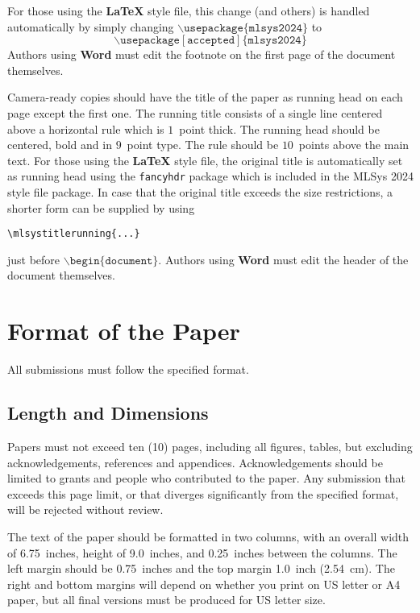 \documentclass{article}
\begin{document}
For those using the \textbf{\LaTeX} style file, this change (and others) is
handled automatically by simply changing
$\mathtt{\backslash usepackage\{mlsys2024\}}$ to
$$\mathtt{\backslash usepackage[accepted]\{mlsys2024\}}$$
Authors using \textbf{Word} must edit the
footnote on the first page of the document themselves.

Camera-ready copies should have the title of the paper as running head
on each page except the first one. The running title consists of a
single line centered above a horizontal rule which is $1$~point thick.
The running head should be centered, bold and in $9$~point type. The
rule should be $10$~points above the main text. For those using the
\textbf{\LaTeX} style file, the original title is automatically set as running
head using the \texttt{fancyhdr} package which is included in the MLSys
2024 style file package. In case that the original title exceeds the
size restrictions, a shorter form can be supplied by using

\verb|\mlsystitlerunning{...}|

just before $\mathtt{\backslash begin\{document\}}$.
Authors using \textbf{Word} must edit the header of the document themselves.

\section{Format of the Paper}

All submissions must follow the specified format.

\subsection{Length and Dimensions}

Papers must not exceed ten (10) pages, including all figures, tables,
but excluding acknowledgements, references and appendices.
Acknowledgements should be limited to grants and people who contributed to the paper.
Any submission that exceeds
this page limit, or that diverges significantly from the specified format,
will be rejected without review.

The text of the paper should be formatted in two columns, with an
overall width of 6.75~inches, height of 9.0~inches, and 0.25~inches
between the columns. The left margin should be 0.75~inches and the top
margin 1.0~inch (2.54~cm). The right and bottom margins will depend on
whether you print on US letter or A4 paper, but all final versions
must be produced for US letter size.
\end{document}
